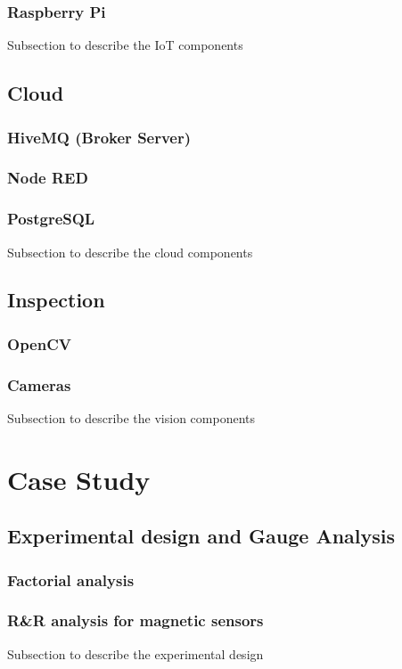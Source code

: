 \documentclass{article}
\begin{document}
\subsubsection{Raspberry Pi}
Subsection to describe the IoT components

\subsection{Cloud}
\subsubsection{HiveMQ (Broker Server)}
\subsubsection{Node RED}
\subsubsection{PostgreSQL}
Subsection to describe the cloud components

\subsection{Inspection}
\subsubsection{OpenCV}
\subsubsection{Cameras}
Subsection to describe the vision components

\section{Case Study}
\subsection{Experimental design and Gauge Analysis}
\subsubsection{Factorial analysis}
\subsubsection{R\&R analysis for magnetic sensors}
Subsection to describe the experimental design 
\end{document}
